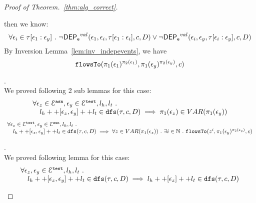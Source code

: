 \begin{proof}[Proof of Theorem.~\ref{thm:alg_correct}]
\begin{case}
\begin{subcase}
\begin{subsubcase}
\[\]
%
%
then we know:
\[
  \forall \mathtt{\epsilon}_i \in \mathtt{\tau}[\mathtt{\epsilon}_1:\mathtt{\epsilon}_y] ~.~
  \neg \mathsf{DEP_{\mathtt{e}}}^{val} (\mathtt{\epsilon}_1, \mathtt{\epsilon}_i, \mathtt{\tau}[\mathtt{\epsilon}_1: \mathtt{\epsilon}_i], c, D) 
  \lor \neg \mathsf{DEP_{\mathtt{e}}}^{val} (\mathtt{\epsilon}_i, \mathtt{\epsilon}_y,\mathtt{\tau}[\mathtt{\epsilon}_i:\mathtt{\epsilon}_y], c, D)
\]
%
By Inversion Lemma~\ref{lem:inv_indepevents}, we have
\[
  \mathtt{flowsTo}(\pi_1(\mathtt{\epsilon}_1)^{\pi_2(\mathtt{\epsilon}_1)}, \pi_1(\mathtt{\epsilon}_y)^{\pi_2(\mathtt{\epsilon}_y)}, c)
\]
%
\end{subsubcase}
%
\end{subcase}
%
%
\begin{subcase}[ $l_e = l_h ++ {[\event_z, \event_b, \event_y]} ++ l_t$ ].
\\
We proved following 2 sub lemmas for this case:
\begin{equation}
  \begin{array}{l}
    \forall \mathtt{\epsilon}_z \in \mathcal{E}^{\mathtt{{asn}}}, \mathtt{\epsilon}_y \in \mathcal{E}^{\mathtt{{test}}}, l_h, l_t ~.~
     \\ \quad 
     l_h ++ [\mathtt{\epsilon}_z, \mathtt{\epsilon}_y] ++ l_t \in \mathtt{dfs}(\mathtt{\tau}, c, D)
    \implies \pi_1(\mathtt{\epsilon}_z) \in VAR(\pi_1(\mathtt{\epsilon}_y))
  \end{array}
  \end{equation}
  \begin{equation}
  \begin{array}{l}
    \forall \mathtt{\epsilon}_z \in \mathcal{E}^{\mathtt{{test}}}, \mathtt{\epsilon}_y \in \mathcal{E}^{\mathtt{{asn}}}, l_h, l_t ~.~
     \\ \quad 
     l_h ++ [\mathtt{\epsilon}_z, \mathtt{\epsilon}_y] ++ l_t \in \mathtt{dfs}(\mathtt{\tau}, c, D)
    \implies \forall z \in VAR(\pi_1(\mathtt{\epsilon}_z)) ~.~ \exists i \in\mathbb{N} ~.~
    \mathtt{flowsTo}(z^i, \pi_1(\mathtt{\epsilon}_y)^{\pi_2(\mathtt{\epsilon}_y)}, c)
  \end{array}
  \end{equation}
%
\end{subcase}
%
%
\begin{subcase}[ $l_e = l_h ++ {[\event_{b_1}, \cdots, \event_{b_n}]} ++ l_t$ ].
%
\\
We proved following lemma for this case:
\begin{equation}
  \begin{array}{l}
    \forall \mathtt{\epsilon}_z, \mathtt{\epsilon}_y \in \mathcal{E}^{\mathtt{{test}}}, l_h, l_t ~.~
     \\ \quad 
     l_h ++ [\mathtt{\epsilon}_z, \mathtt{\epsilon}_y] ++ l_t \in \mathtt{dfs}(\mathtt{\tau}, c, D)
    \implies l_h ++ [\mathtt{\epsilon}_z] ++ l_t \in \mathtt{dfs}(\mathtt{\tau}, c, D)
  \end{array}
  \end{equation}
\end{subcase}
%
\end{case}
%
\end{proof}